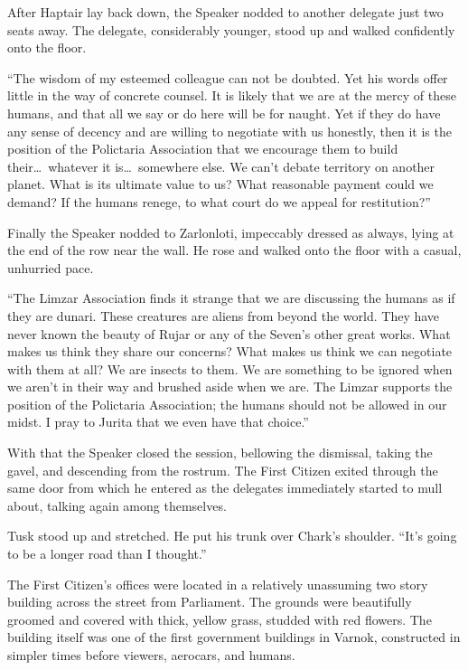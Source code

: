 After Haptair lay back down, the Speaker nodded to another delegate just two seats away. The
delegate, considerably younger, stood up and walked confidently onto the floor.

``The wisdom of my esteemed colleague can not be doubted. Yet his words offer little in the way
of concrete counsel. It is likely that we are at the mercy of these humans, and that all we say
or do here will be for naught. Yet if they do have any sense of decency and are willing to
negotiate with us honestly, then it is the position of the Polictaria Association that we
encourage them to build their\ldots\ whatever it is\ldots\ somewhere else. We can't debate
territory on another planet. What is its ultimate value to us? What reasonable payment could we
demand? If the humans renege, to what court do we appeal for restitution?''

Finally the Speaker nodded to Zarlonloti, impeccably dressed as always, lying at the end of the
row near the wall. He rose and walked onto the floor with a casual, unhurried pace.

``The Limzar Association finds it strange that we are discussing the humans as if they are
dunari. These creatures are aliens from beyond the world. They have never known the beauty of
Rujar or any of the Seven's other great works. What makes us think they share our concerns? What
makes us think we can negotiate with them at all? We are insects to them. We are something to be
ignored when we aren't in their way and brushed aside when we are. The Limzar supports the
position of the Polictaria Association; the humans should not be allowed in our midst. I pray to
Jurita that we even have that choice.''

With that the Speaker closed the session, bellowing the dismissal, taking the gavel, and
descending from the rostrum. The First Citizen exited through the same door from which he
entered as the delegates immediately started to mull about, talking again among themselves.

Tusk stood up and stretched. He put his trunk over Chark's shoulder. ``It's going to be a longer
road than I thought.''

\spacebreak

The First Citizen's offices were located in a relatively unassuming two story building across
the street from Parliament. The grounds were beautifully groomed and covered with thick, yellow
grass, studded with red flowers. The building itself was one of the first government buildings
in Varnok, constructed in simpler times before viewers, aerocars, and humans.

